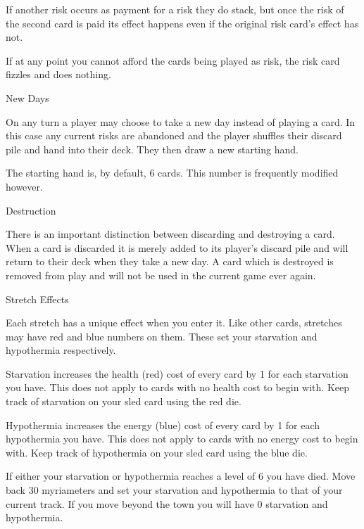 \documentclass{article}
\begin{document}
\begin{multicols}{3}
    If another risk occurs as payment for a risk they do stack, but once the
    risk of the second card is paid its effect happens even if the original risk
    card's effect has not.

    If at any point you cannot afford the cards being played as risk, the risk
    card fizzles and does nothing.

{\noindent\fontsize{18}{18}\Racing New Days\par}

    On any turn a player may choose to take a new day instead of playing a card.
    In this case any current risks are abandoned and the player shuffles their
    discard pile and hand into their deck. They then draw a new starting hand.

    The starting hand is, by default, 6 cards. This number is frequently
    modified however.

{\noindent\fontsize{18}{18}\Racing Destruction\par}

    There is an important distinction between discarding and destroying a card.
    When a card is discarded it is merely added to its player's discard pile and
    will return to their deck when they take a new day. A card which is
    destroyed is removed from play and will not be used in the current game ever
    again.

{\noindent\fontsize{18}{18}\Racing Stretch Effects\par}

    Each stretch has a unique effect when you enter it. Like other cards,
    stretches may have red and blue numbers on them. These set your starvation
    and hypothermia respectively.

    Starvation increases the health (red) cost of every card by 1 for each
    starvation you have. This does not apply to cards with no health cost to
    begin with. Keep track of starvation on your sled card using the red die.

    Hypothermia increases the energy (blue) cost of every card by 1 for each
    hypothermia you have. This does not apply to cards with no energy cost to
    begin with. Keep track of hypothermia on your sled card using the blue die.

    If either your starvation or hypothermia reaches a level of 6 you have died.
    Move back 30 myriameters and set your starvation and hypothermia to that of
    your current track. If you move beyond the town you will have 0 starvation
    and hypothermia.


\end{multicols}
\end{document}
